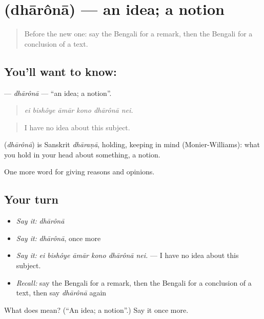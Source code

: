 \section[\texorpdfstring{\bn{ধারণা} (dhārônā)}{ধারণা (dhārônā)}]{ (dhārônā) — an idea; a notion}

\label{lesson:BN-C357-dharona}



\begin{quote}
Before the new one: say the Bengali for a remark, then the Bengali for a conclusion of a text.
\end{quote}

\subsection*{You'll want to know: }
\textbf{} — \emph{dhārônā} — \textquotedblleft{}an idea; a notion\textquotedblright{}.

\begin{quote}
     
\end{quote}

\begin{quote}
\emph{ei bishôye āmār kono dhārônā nei.}
\end{quote}

\begin{quote}
I have no idea about this subject.
\end{quote}

\begin{cousinweb}
\textbf{} (\emph{dhārônā}) is Sanskrit \emph{dhāraṇā}, holding, keeping in mind (Monier-Williams): what you hold in your head about something, a notion.
\end{cousinweb}

\begin{grammarlens}[title={What you've built}]
One more word for giving reasons and opinions.
\end{grammarlens}

\subsection*{Your turn}
\begin{itemize}
\raggedright
  \item \emph{Say it:} \emph{dhārônā}
  \item \emph{Say it:} \emph{dhārônā}, once more
  \item \emph{Say it:} \emph{ei bishôye āmār kono dhārônā nei.} — I have no idea about this subject.
  \item \emph{Recall:} say the Bengali for a remark, then the Bengali for a conclusion of a text, then say \emph{dhārônā} again
\end{itemize}

\begin{tcolorbox}[breakable,colback=teal!4,colframe=teal!35!black,title={Before you move on}]
What does  mean? (\textquotedblleft{}An idea; a notion\textquotedblright{}.) Say it once more.
\end{tcolorbox}
